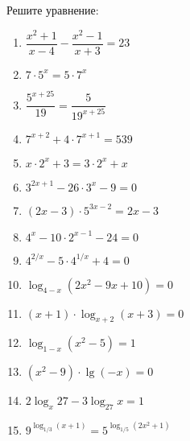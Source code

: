 \documentclass[12pt, a4paper]{article}
\begin{document}
	  
	Решите уравнение:
	\begin{multicols}{2}
		\begin{enumerate}[label=\textbf{\arabic*.}]
			\item \( \dfrac{x^2+1}{x-4}-\dfrac{x^2-1}{x+3}=23 \)
			\item \( 7\cdot5^x=5\cdot7^x \)
			\item \( \dfrac{5^{x+25}}{19}=\dfrac{5}{19^{x+25}} \)
			\item \( 7^{x+2}+4\cdot7^{x+1}=539 \)
			\item \( x\cdot2^x+3=3\cdot2^x+x \)
			\item \( 3^{2x+1}-26\cdot3^x-9=0 \)
			\item \( (2x-3)\cdot5^{3x-2}=2x-3 \)
			\item \( 4^x-10\cdot2^{x-1}-24=0 \)
			\item \( 4^{2/x}-5\cdot4^{1/x}+4=0 \)
			\item \( \log_{4-x}(2x^2-9x+10)=0 \)
			\item \( (x+1)\cdot\log_{x+2}(x+3)=0 \)
			\item \( \log_{1-x}(x^2-5)=1 \)
			\item \( (x^2-9)\cdot\lg(-x)=0 \)
			\item \( 2\log_x 27 -3\log_27 x=1\)
			\item \( 9^{\log_{1/3}(x+1)}=5^{\log_{1/5}(2x^2+1)}\)
		\end{enumerate}
	\end{multicols}
\end{document}
